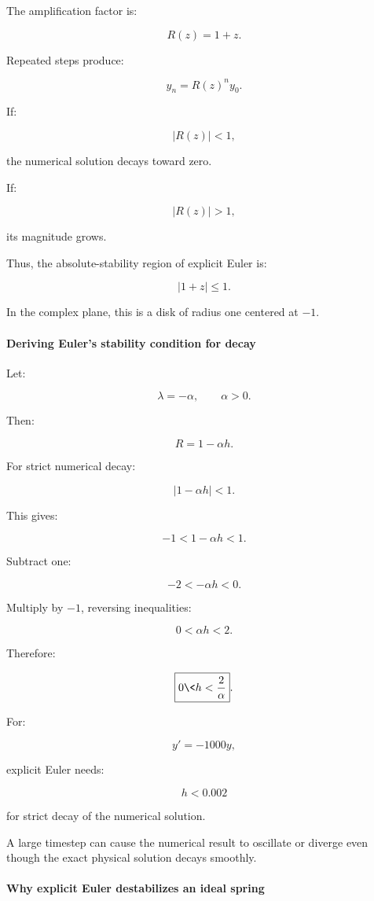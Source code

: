 The amplification factor is:

\[
R(z)=1+z.
\]

Repeated steps produce:

\[
y_n=R(z)^ny_0.
\]

If:

\[
|R(z)|<1,
\]

the numerical solution decays toward zero.

If:

\[
|R(z)|>1,
\]

its magnitude grows.

Thus, the absolute-stability region of explicit Euler is:

\[
\boxed{|1+z|\le1}.
\]

In the complex plane, this is a disk of radius one centered at \(-1\).

\paragraph{Deriving Euler's stability condition for decay}\label{02-foundations-ii-ch025-deriving-eulers-stability-condition-for-decay}

Let:

\[
\lambda=-\alpha,\qquad\alpha>0.
\]

Then:

\[
R=1-\alpha h.
\]

For strict numerical decay:

\[
|1-\alpha h|<1.
\]

This gives:

\[
-1<1-\alpha h<1.
\]

Subtract one:

\[
-2<-\alpha h<0.
\]

Multiply by \(-1\), reversing inequalities:

\[
0<\alpha h<2.
\]

Therefore:

\[
\boxed{ 0\<h<\frac2\alpha }.
\]

For:

\[
y'=-1000y,
\]

explicit Euler needs:

\[
\boxed{h<0.002}
\]

for strict decay of the numerical solution.

A large timestep can cause the numerical result to oscillate or diverge even though the exact physical solution decays smoothly.

\paragraph{Why explicit Euler destabilizes an ideal spring}\label{02-foundations-ii-ch025-why-explicit-euler-destabilizes-an-ideal-spring}

